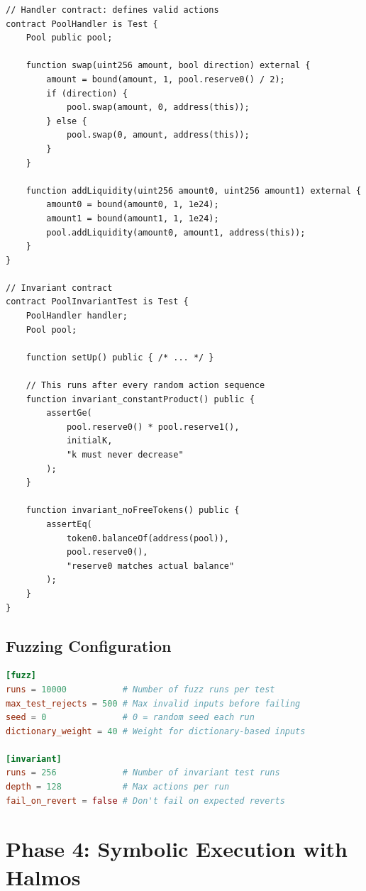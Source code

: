 \documentclass[11pt,a4paper]{article}
\begin{document}
\begin{lstlisting}[language=Solidity,caption={Stateful invariant test}]
// Handler contract: defines valid actions
contract PoolHandler is Test {
    Pool public pool;

    function swap(uint256 amount, bool direction) external {
        amount = bound(amount, 1, pool.reserve0() / 2);
        if (direction) {
            pool.swap(amount, 0, address(this));
        } else {
            pool.swap(0, amount, address(this));
        }
    }

    function addLiquidity(uint256 amount0, uint256 amount1) external {
        amount0 = bound(amount0, 1, 1e24);
        amount1 = bound(amount1, 1, 1e24);
        pool.addLiquidity(amount0, amount1, address(this));
    }
}

// Invariant contract
contract PoolInvariantTest is Test {
    PoolHandler handler;
    Pool pool;

    function setUp() public { /* ... */ }

    // This runs after every random action sequence
    function invariant_constantProduct() public {
        assertGe(
            pool.reserve0() * pool.reserve1(),
            initialK,
            "k must never decrease"
        );
    }

    function invariant_noFreeTokens() public {
        assertEq(
            token0.balanceOf(address(pool)),
            pool.reserve0(),
            "reserve0 matches actual balance"
        );
    }
}
\end{lstlisting}

\subsection{Fuzzing Configuration}

\begin{lstlisting}[language=TOML,caption={foundry.toml fuzz configuration}]
[fuzz]
runs = 10000           # Number of fuzz runs per test
max_test_rejects = 500 # Max invalid inputs before failing
seed = 0               # 0 = random seed each run
dictionary_weight = 40 # Weight for dictionary-based inputs

[invariant]
runs = 256             # Number of invariant test runs
depth = 128            # Max actions per run
fail_on_revert = false # Don't fail on expected reverts
\end{lstlisting}

\section{Phase 4: Symbolic Execution with Halmos}
\end{document}
